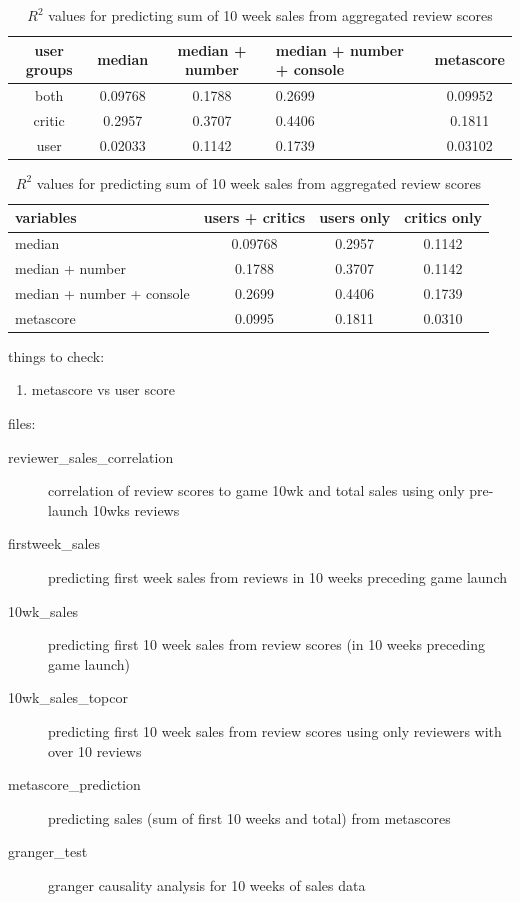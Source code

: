 \documentclass[letterpaper]{article}
\begin{document}
\begin{table}[tb]
\begin{tabular}{|c|c|c|p{}|c|}
\hline user groups & median & median + number & median + number + console & metascore \\
\hline both & 0.09768 & 0.1788 & 0.2699 & 0.09952 \\
\hline critic & 0.2957 & 0.3707 & 0.4406 & 0.1811 \\ 
\hline user & 0.02033 & 0.1142 & 0.1739 & 0.03102 \\ 
\hline 
\end{tabular}
\caption{$R^2$ values for predicting sum of 10 week sales from aggregated review scores}
\end{table}

\begin{table}[tb]
\begin{tabular}{|p{}|c|c|c|}
\hline variables & users + critics & users only & critics only \\
\hline median & 0.09768 & 0.2957 & 0.1142 \\
\hline median + number & 0.1788 & 0.3707 & 0.1142 \\ 
\hline median + number + console & 0.2699 & 0.4406 & 0.1739 \\ 
\hline metascore & 0.0995 & 0.1811 & 0.0310 \\ 
\hline 
\end{tabular}
\caption{$R^2$ values for predicting sum of 10 week sales from aggregated review scores}
\end{table}

things to check:
\begin{enumerate}
\item metascore vs user score
\end{enumerate}


files:
\begin{description}
\item[reviewer\_sales\_correlation] correlation of review scores to game 10wk and total sales using only pre-launch 10wks reviews
\item[firstweek\_sales] predicting first week sales from reviews in 10 weeks preceding game launch
\item[10wk\_sales] predicting first 10 week sales from review scores (in 10 weeks preceding game launch)
\item[10wk\_sales\_topcor] predicting first 10 week sales from review scores using only reviewers with over 10 reviews
\item[metascore\_prediction] predicting sales (sum of first 10 weeks and total) from metascores
\item[granger\_test] granger causality analysis for 10 weeks of sales data
\end{description}
\end{document}
